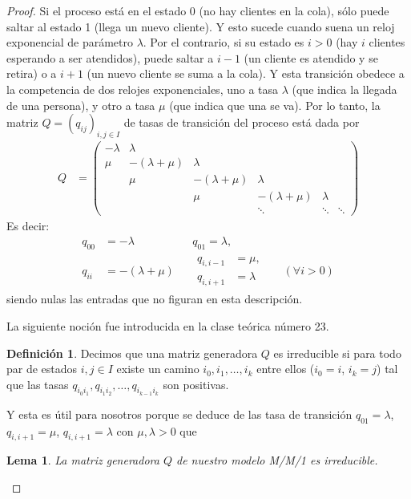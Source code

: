 \documentclass{article}
\newtheorem{lemma}{Lema}
\theoremstyle{definition}
\newtheorem{definition}{Definición}
\begin{document}
\begin{proof}
Si el proceso está en el estado 0 (no hay clientes en la cola), sólo puede saltar al estado 1 (llega un nuevo cliente). 
Y esto sucede cuando suena un reloj exponencial de parámetro \(\lambda\).
Por el contrario, si su estado es \(i > 0\) (hay \(i\) clientes esperando a ser atendidos), puede saltar a \(i - 1\) (un cliente es atendido y se retira) o a \(i + 1\) (un nuevo cliente se suma a la cola).
Y esta transición obedece a la competencia de dos relojes exponenciales, uno a tasa \(\lambda\) (que indica la llegada de una persona), y otro a tasa \(\mu\) (que indica que una se va).
Por lo tanto, la matriz \(Q = (q_{i j})_{i, j \in I}\) de tasas de transición del proceso está dada por
\begin{align}
	Q
	&=
	\begin{pmatrix}
		- \lambda &\lambda \\
		\mu &- (\lambda + \mu) &\lambda \\
		 &\mu &- (\lambda + \mu) &\lambda \\
		 & &\mu &- (\lambda + \mu) &\lambda \\
		 & & &\ddots &\ddots &\ddots
	\end{pmatrix}
\end{align}
Es decir:
\begin{align}
	q_{0 0} &= - \lambda & &q_{0 1} = \lambda,
	\\
	q_{i i} &= - (\lambda + \mu) & &\begin{aligned}q_{i, i-1} &= \mu,\\ q_{i, i+1} &= \lambda \end{aligned} &&(\forall i > 0)
\end{align}
siendo nulas las entradas que no figuran en esta descripción.

La siguiente noción fue introducida en la clase teórica número 23.
\begin{definition}
Decimos que una matriz generadora \(Q\) es irreducible si para todo par de estados \(i, j \in I\) existe un camino \(i_0, i_1, \dots, i_k\) entre ellos (\(i_0 = i\), \(i_k = j\)) tal que las tasas \(q_{i_0 i_1}, q_{i_1 i_2}, \dots, q_{i_{k - 1} i_k}\) son positivas.
\end{definition}
Y esta es útil para nosotros porque se deduce de las tasa de transición \(q_{01} = \lambda\), \(q_{i, i + 1} = \mu\), \(q_{i, i + 1} = \lambda\) con \(\mu, \lambda > 0\) que
\begin{lemma}
\label{lemma:GeneratorMatrixIsIrreducible}
La matriz generadora \(Q\) de nuestro modelo M/M/1 es irreducible.
\end{lemma}


\end{proof}
\end{document}
